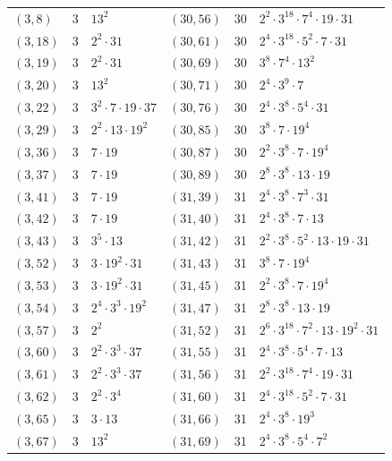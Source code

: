 \documentclass[11pt]{article}
\begin{document}
\begin{longtable}{@{}lrl@{\qquad}lrl@{}}
$(3,8)$ & 3 & $13^{2}$ & $(30,56)$ & 30 & $2^{2}\cdot 3^{18}\cdot 7^{4}\cdot 19\cdot 31$\\
$(3,18)$ & 3 & $2^{2}\cdot 31$ & $(30,61)$ & 30 & $2^{4}\cdot 3^{18}\cdot 5^{2}\cdot 7\cdot 31$\\
$(3,19)$ & 3 & $2^{2}\cdot 31$ & $(30,69)$ & 30 & $3^{8}\cdot 7^{4}\cdot 13^{2}$\\
$(3,20)$ & 3 & $13^{2}$ & $(30,71)$ & 30 & $2^{4}\cdot 3^{9}\cdot 7$\\
$(3,22)$ & 3 & $3^{2}\cdot 7\cdot 19\cdot 37$ & $(30,76)$ & 30 & $2^{4}\cdot 3^{8}\cdot 5^{4}\cdot 31$\\
$(3,29)$ & 3 & $2^{2}\cdot 13\cdot 19^{2}$ & $(30,85)$ & 30 & $3^{8}\cdot 7\cdot 19^{4}$\\
$(3,36)$ & 3 & $7\cdot 19$ & $(30,87)$ & 30 & $2^{2}\cdot 3^{8}\cdot 7\cdot 19^{4}$\\
$(3,37)$ & 3 & $7\cdot 19$ & $(30,89)$ & 30 & $2^{8}\cdot 3^{8}\cdot 13\cdot 19$\\
$(3,41)$ & 3 & $7\cdot 19$ & $(31,39)$ & 31 & $2^{4}\cdot 3^{8}\cdot 7^{3}\cdot 31$\\
$(3,42)$ & 3 & $7\cdot 19$ & $(31,40)$ & 31 & $2^{4}\cdot 3^{8}\cdot 7\cdot 13$\\
$(3,43)$ & 3 & $3^{5}\cdot 13$ & $(31,42)$ & 31 & $2^{2}\cdot 3^{8}\cdot 5^{2}\cdot 13\cdot 19\cdot 31$\\
$(3,52)$ & 3 & $3\cdot 19^{2}\cdot 31$ & $(31,43)$ & 31 & $3^{8}\cdot 7\cdot 19^{4}$\\
$(3,53)$ & 3 & $3\cdot 19^{2}\cdot 31$ & $(31,45)$ & 31 & $2^{2}\cdot 3^{8}\cdot 7\cdot 19^{4}$\\
$(3,54)$ & 3 & $2^{4}\cdot 3^{3}\cdot 19^{2}$ & $(31,47)$ & 31 & $2^{8}\cdot 3^{8}\cdot 13\cdot 19$\\
$(3,57)$ & 3 & $2^{2}$ & $(31,52)$ & 31 & $2^{6}\cdot 3^{18}\cdot 7^{2}\cdot 13\cdot 19^{2}\cdot 31$\\
$(3,60)$ & 3 & $2^{2}\cdot 3^{3}\cdot 37$ & $(31,55)$ & 31 & $2^{4}\cdot 3^{8}\cdot 5^{4}\cdot 7\cdot 13$\\
$(3,61)$ & 3 & $2^{2}\cdot 3^{3}\cdot 37$ & $(31,56)$ & 31 & $2^{2}\cdot 3^{18}\cdot 7^{4}\cdot 19\cdot 31$\\
$(3,62)$ & 3 & $2^{2}\cdot 3^{4}$ & $(31,60)$ & 31 & $2^{4}\cdot 3^{18}\cdot 5^{2}\cdot 7\cdot 31$\\
$(3,65)$ & 3 & $3\cdot 13$ & $(31,66)$ & 31 & $2^{4}\cdot 3^{8}\cdot 19^{3}$\\
$(3,67)$ & 3 & $13^{2}$ & $(31,69)$ & 31 & $2^{4}\cdot 3^{8}\cdot 5^{4}\cdot 7^{2}$\\

\end{longtable}
\end{document}

